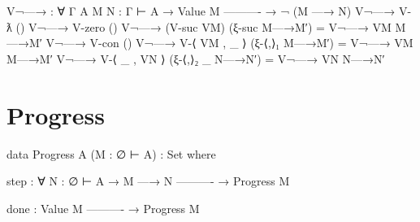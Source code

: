 \begin{fence}
\begin{code}
V¬—→ : ∀ {Γ A} {M N : Γ ⊢ A}
  → Value M
    ----------
  → ¬ (M —→ N)
V¬—→ V-ƛ          ()
V¬—→ V-zero       ()
V¬—→ (V-suc VM)   (ξ-suc M—→M′)     =  V¬—→ VM M—→M′
V¬—→ V-con        ()
V¬—→ V-⟨ VM , _ ⟩ (ξ-⟨,⟩₁ M—→M′)    =  V¬—→ VM M—→M′
V¬—→ V-⟨ _ , VN ⟩ (ξ-⟨,⟩₂ _ N—→N′)  =  V¬—→ VN N—→N′
\end{code}
\end{fence}

\hypertarget{progress}{%
\section{Progress}\label{progress}}

\begin{fence}
\begin{code}
data Progress {A} (M : ∅ ⊢ A) : Set where

  step : ∀ {N : ∅ ⊢ A}
    → M —→ N
      ----------
    → Progress M

  done :
      Value M
      ----------
    → Progress M


\end{code}
\end{fence}
